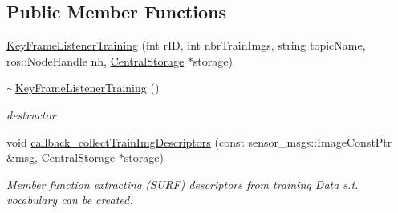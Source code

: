 \subsection*{\-Public \-Member \-Functions}
\begin{DoxyCompactItemize}
\item 
\hyperlink{classKeyFrameListenerTraining_a79991f22508bb1680c0913cb6003abb6}{\-Key\-Frame\-Listener\-Training} (int r\-I\-D, int nbr\-Train\-Imgs, string topic\-Name, ros\-::\-Node\-Handle nh, \hyperlink{classCentralStorage}{\-Central\-Storage} $\ast$storage)
\item 
\hyperlink{classKeyFrameListenerTraining_a18c4d5ed913633aafb8ab8173aaf3431}{$\sim$\-Key\-Frame\-Listener\-Training} ()
\begin{DoxyCompactList}\small\item\em destructor \end{DoxyCompactList}\item 
void \hyperlink{classKeyFrameListenerTraining_a437c11f515c20b51d30ef40d637a25ba}{callback\-\_\-collect\-Train\-Img\-Descriptors} (const sensor\-\_\-msgs\-::\-Image\-Const\-Ptr \&msg, \hyperlink{classCentralStorage}{\-Central\-Storage} $\ast$storage)
\begin{DoxyCompactList}\small\item\em \-Member function extracting (\-S\-U\-R\-F) descriptors from training \-Data s.\-t. vocabulary can be created. \end{DoxyCompactList}\end{DoxyCompactItemize}
